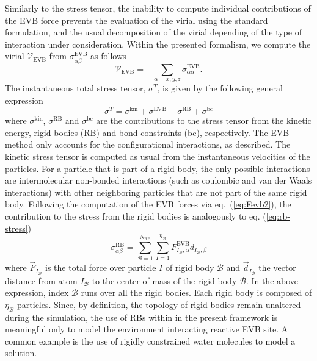Similarly to the stress tensor, the inability to compute individual contributions of the EVB force  \cite{scivetti-evb} prevents the evaluation of the virial using the standard formulation, and the usual decomposition of the virial depending of the type of interaction under consideration. Within the presented formalism, we compute the virial $\mathcal{V}_{\text{EVB}}$ from $\sigma_{\alpha\beta}^{\text{EVB}}$ as follows
\begin{equation}\label{eq:virial-total}
\mathcal{V}_{\text{EVB}}=-\sum_{\alpha=x,y,z} \sigma_{\alpha\alpha}^{\text{EVB}}.
\end{equation}
The instantaneous total stress tensor, $\sigma^{T}$, is given by the following general expression
\begin{equation}\label{eq:stress-total}
\sigma^{T}=\sigma^{\text{kin}}+\sigma^{\text{EVB}}+\sigma^{\text{RB}}+\sigma^{\text{bc}}
\end{equation}
where $\sigma^{\text{kin}}$, $\sigma^{\text{RB}}$ and $\sigma^{\text{bc}}$ are the contributions to the stress tensor from the kinetic energy, rigid bodies (RB) and bond constraints (bc), respectively. The EVB method only accounts for the configurational interactions, as described. The kinetic stress tensor is computed as usual from the instantaneous velocities of the particles. For a particle that is part of a rigid body, the only possible interactions are intermolecular non-bonded interactions (such as coulombic and van der Waals interactions) with other neighboring particles that are not part of the same rigid body. Following the computation of the EVB forces via eq.~(\ref{eq:Fevb2}), the contribution to the stress from the rigid bodies is analogously to eq. (\ref{eq:rb-stress})
\begin{equation}\label{eq:stress-RG}
\sigma_{\alpha\beta}^{\text{RB}}=\sum_{\mathcal{B}=1}^{N_{\text{RB}}}\sum_{I=1}^{\eta_{\mathcal{B}}} {F}_{I_{\mathcal{B}},\alpha}^{\text{EVB}} d_{I_{\mathcal{B}},\beta}	
\end{equation}
where $\vec{F}_{I_{\mathcal{B}}}$ is the total force over particle $I$ of rigid body $\mathcal{B}$ and $\vec{d}_{I_{\mathcal{B}}}$ the vector distance from atom $I_{\mathcal{B}}$ to the center of mass of the rigid body $\mathcal{B}$. In the above expression, index $\mathcal{B}$ runs over all the rigid bodies. Each rigid body is composed of $\eta_{\mathcal{B}}$ particles. Since, by definition, the topology of rigid bodies remain unaltered during the simulation, the use of RBs within in the present framework is meaningful only to model the environment interacting reactive EVB site. A common example is the use of rigidly constrained water molecules to model a solution.\\
